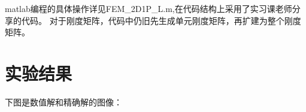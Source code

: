 \documentclass{article}
\begin{document}
matlab编程的具体操作详见FEM\_2D1P\_L.m,在代码结构上采用了实习课老师分享的代码。
对于刚度矩阵，代码中仍旧先生成单元刚度矩阵，再扩建为整个刚度矩阵。


\newpage
\section{实验结果}

下图是数值解和精确解的图像：
\begin{figure}[H]
\end{figure}
\end{document}
